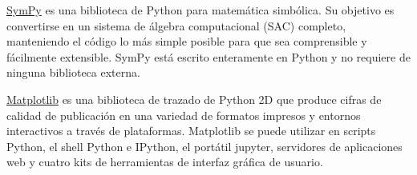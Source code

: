 \href{http://www.sympy.org/}{SymPy}
es una biblioteca de Python para matemática simbólica. Su objetivo es convertirse en 
un sistema de álgebra computacional (SAC) completo, manteniendo el código lo más simple 
posible para que sea comprensible y fácilmente extensible. SymPy está escrito enteramente 
en Python y no requiere de ninguna biblioteca externa.
% 
% 



\href{http://matplotlib.org/}{Matplotlib} es una biblioteca de trazado de Python 2D que produce cifras de calidad de publicación en una variedad de formatos impresos y entornos interactivos a través de plataformas. Matplotlib se puede utilizar en scripts Python, el shell Python e IPython, el portátil jupyter, servidores de aplicaciones web y cuatro kits de herramientas de interfaz gráfica de usuario.






% 
% 
% 
% 



